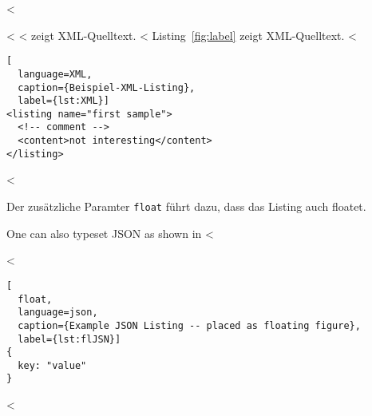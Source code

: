 <%

<%
<%
 zeigt XML-Quelltext.
<%
Listing~\ref{fig:label} zeigt XML-Quelltext.
<%

\begin{lstlisting}[
  language=XML,
  caption={Beispiel-XML-Listing},
  label={lst:XML}]
<listing name="first sample">
  <!-- comment -->
  <content>not interesting</content>
</listing>
\end{lstlisting}
<%

Der zusätzliche Paramter \verb+float+ führt dazu, dass das Listing auch floatet.

One can also typeset JSON as shown in <%

<%
\begin{lstlisting}[
  float,
  language=json,
  caption={Example JSON Listing -- placed as floating figure},
  label={lst:flJSN}]
{
  key: "value"
}
\end{lstlisting}
<%
